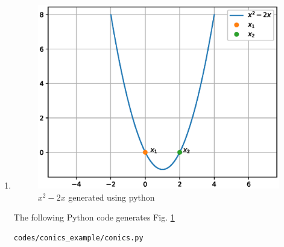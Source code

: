 \begin{enumerate}[label=\thesubsection.\arabic*.,ref=\thesubsection.\theenumi]
\item \begin{figure}[!ht]
\centering
\includegraphics[width=\columnwidth]{./figs/conics_example/quadratic_equation.eps}
\caption{$x^2 -2x$ generated using python}
\label{fig:quadeq_conics_example}
\end{figure} 
The  following Python code generates Fig. \ref{fig:quadeq_conics_example}

\begin{lstlisting}
codes/conics_example/conics.py
\end{lstlisting}
\end{enumerate}